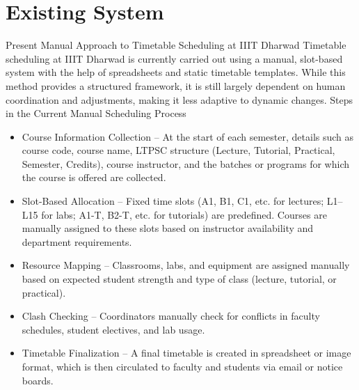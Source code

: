 \documentclass[12pt]{article}
\begin{document}
\section{Existing System}
Present Manual Approach to Timetable Scheduling at IIIT Dharwad
Timetable scheduling at IIIT Dharwad is currently carried out using a manual, slot-based system with the help of spreadsheets and static timetable templates. While this method provides a structured framework, it is still largely dependent on human coordination and adjustments, making it less adaptive to dynamic changes.
Steps in the Current Manual Scheduling Process
\begin{itemize}
\item Course Information Collection – At the start of each semester, details such as course code, course name, LTPSC structure (Lecture, Tutorial, Practical, Semester, Credits), course instructor, and the batches or programs for which the course is offered are collected.
\item Slot-Based Allocation – Fixed time slots (A1, B1, C1, etc. for lectures; L1–L15 for labs; A1-T, B2-T, etc. for tutorials) are predefined. Courses are manually assigned to these slots based on instructor availability and department requirements.
\item Resource Mapping – Classrooms, labs, and equipment are assigned manually based on expected student strength and type of class (lecture, tutorial, or practical).
\item Clash Checking – Coordinators manually check for conflicts in faculty schedules, student electives, and lab usage.
\item Timetable Finalization – A final timetable is created in spreadsheet or image format, which is then circulated to faculty and students via email or notice boards.
\end{itemize}
\end{document}
